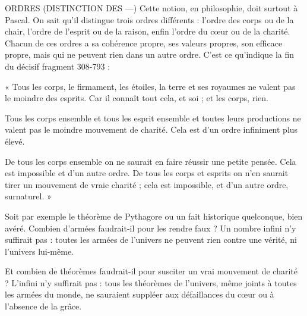 ORDRES (DISTINCTION DES —) Cette notion, en philosophie, doit surtout
à Pascal. On sait qu’il distingue
trois ordres différents : l’ordre des corps ou de la chair, l’ordre de l’esprit ou de
la raison, enfin l’ordre du cœur ou de la charité. Chacun de ces ordres a sa
cohérence propre, ses valeurs propres, son efficace propre, mais qui ne peuvent
rien dans un autre ordre. C’est ce qu’indique la fin du décisif fragment 308-793 :

\vspace{0.5cm}

{\footnotesize 
« Tous les corps, le firmament, les étoiles, la terre et ses royaumes ne valent pas le
moindre des esprits. Car il connaît tout cela, et soi ; et les corps, rien.

Tous les corps ensemble et tous les esprit ensemble et toutes leurs productions ne
valent pas le moindre mouvement de charité. Cela est d’un ordre infiniment plus élevé.

De tous les corps ensemble on ne saurait en faire réussir une petite pensée. Cela est
impossible et d’un autre ordre. De tous les corps et esprits on n’en saurait tirer un mouvement
de vraie charité ; cela est impossible, et d’un autre ordre, surnaturel. »
}

\vspace{0.5cm}

Soit par exemple le théorème de Pythagore ou un fait historique quelconque,
bien avéré. Combien d’armées faudrait-il pour les rendre faux ? Un
nombre infini n’y suffirait pas : toutes les armées de l’univers ne peuvent rien
contre une vérité, ni l’univers lui-même.

Et combien de théorèmes faudrait-il pour susciter un vrai mouvement de
charité ? L’infini n’y suffirait pas : tous les théorèmes de l’univers, même joints
à toutes les armées du monde, ne sauraient suppléer aux défaillances du cœur
ou à l’absence de la grâce.

